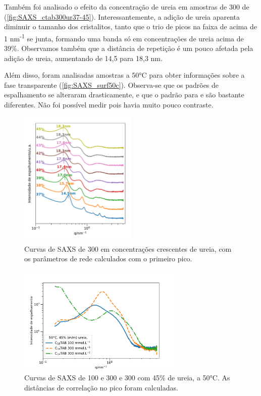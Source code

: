 	Também foi analisado o efeito da concentração de ureia em amostras de 300 \mM{} de \CTAB{} (\autoref{fig:SAXS_ctab300ur37-45}). Interessantemente, a adição de ureia aparenta diminuir o tamanho dos cristalitos, tanto que o trio de picos na faixa de \q{} acima de 1 nm\textsuperscript{-1} se junta, formando uma banda só em concentrações de ureia acima de 39\%. Observamos também que a distância de repetição é um pouco afetada pela adição de ureia, aumentando de 14,5 para 18,3 nm.
	
	Além disso, foram analisadas amostras a 50°C para obter informações sobre a fase transparente (\autoref{fig:SAXS_surf50c}). Observa-se que os padrões de espalhamento se alteraram drasticamente, e que o padrão para \CTAB{} e \TTAB{} são bastante diferentes. Não foi possível medir \DTAB{} pois havia muito pouco contraste.
	
	\begin{figure}[h]
		\centering
		\includegraphics[width=0.5\textwidth]{imagens/saxs/CTAB300Ur37-45}
		\caption{Curvas de SAXS de \CTAB{} 300 \mM{} em concentrações crescentes de ureia, com os parâmetros de rede calculados com o primeiro pico.}
		\label{fig:SAXS_ctab300ur37-45}
	\end{figure}
	
	\begin{figure}[h]
		\centering
		\includegraphics[width=0.7\textwidth]{imagens/saxs/Surf_50C}
		\caption{Curvas de SAXS de \CTAB{} 100 e 300 \mM{} e \TTAB{} 300 \mM{} com 45\% de ureia, a 50°C. As distâncias de correlação no pico foram calculadas.}
		\label{fig:SAXS_surf50c}
	\end{figure}

